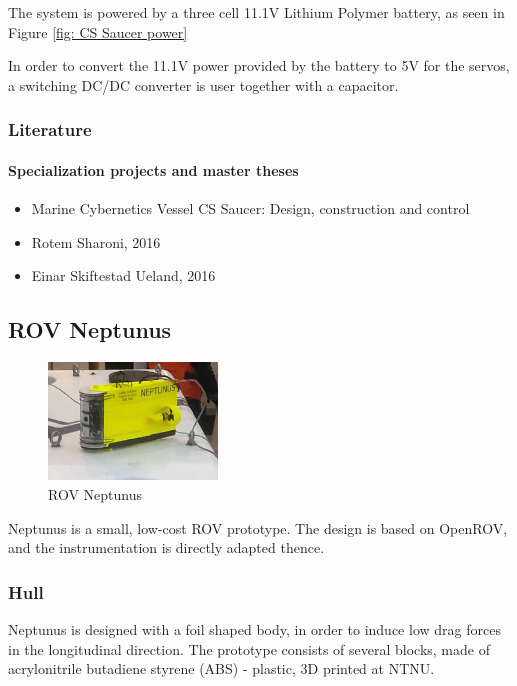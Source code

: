 \documentclass[a4paper,twoside,english]{report}
\begin{document}
The system is powered by a three cell 11.1V Lithium Polymer battery,
as seen in Figure \ref{fig: CS Saucer power}

In order to convert the 11.1V power provided by the battery to 5V
for the servos, a switching DC/DC converter is user together with
a capacitor.

\subsubsection{Literature}

\paragraph{Specialization projects and master theses}
\begin{itemize}
\item Marine Cybernetics Vessel CS Saucer: Design, construction and control
\citep{Idland2015} 
\item Rotem Sharoni, 2016
\item Einar Skiftestad Ueland, 2016
\end{itemize}
\clearpage{}

\subsection{ROV Neptunus}

\begin{figure}
\centering \includegraphics[width=0.4\textwidth]{fig/ROVNeptunus_1}
\caption{\label{fig: ROV Neptunus}ROV Neptunus}
\end{figure}

Neptunus is a small, low-cost ROV prototype. The design is based on
OpenROV, and the instrumentation is directly adapted thence.

\subsubsection{Hull}

Neptunus is designed with a foil shaped body, in order to induce low
drag forces in the longitudinal direction. The prototype consists
of several blocks, made of acrylonitrile butadiene styrene (ABS) -
plastic, 3D printed at NTNU.
\end{document}

